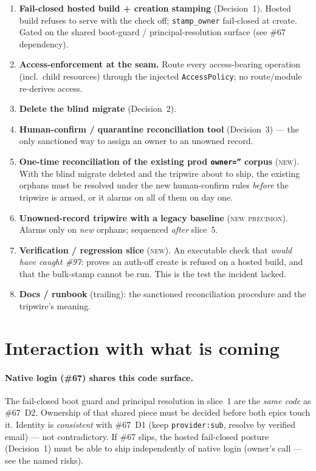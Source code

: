 \documentclass[11pt]{article}
\begin{document}
\begin{enumerate}[leftmargin=1.6em]
  \item \textbf{Fail-closed hosted build + creation stamping} (Decision~1). Hosted build refuses
  to serve with the check off; \texttt{stamp\_owner} fail-closed at create. Gated on the shared
  boot-guard / principal-resolution surface (see \#67 dependency).
  \item \textbf{Access-enforcement at the seam.} Route every access-bearing operation (incl.\
  child resources) through the injected \texttt{AccessPolicy}; no route/module re-derives access.
  \item \textbf{Delete the blind migrate} (Decision~2).
  \item \textbf{Human-confirm / quarantine reconciliation tool} (Decision~3) --- the only
  sanctioned way to assign an owner to an unowned record.
  \item \textbf{One-time reconciliation of the existing prod \texttt{owner=''} corpus}
  (\textsc{new}). With the blind migrate deleted and the tripwire about to ship, the existing
  orphans must be resolved under the new human-confirm rules \emph{before} the tripwire is armed,
  or it alarms on all of them on day one.
  \item \textbf{Unowned-record tripwire with a legacy baseline} (\textsc{new precision}). Alarms
  only on \emph{new} orphans; sequenced \emph{after} slice~5.
  \item \textbf{Verification / regression slice} (\textsc{new}). An executable check that
  \emph{would have caught \#97}: proves an auth-off create is refused on a hosted build, and that
  the bulk-stamp cannot be run. This is the test the incident lacked.
  \item \textbf{Docs / runbook} (trailing): the sanctioned reconciliation procedure and the
  tripwire's meaning.
\end{enumerate}

\section{Interaction with what is coming}
\label{sec:forward}

\paragraph{Native login (\#67) shares this code surface.} The fail-closed boot guard and
principal resolution in slice~1 are the \emph{same code} as \#67~D2. Ownership of that shared
piece must be decided before both epics touch it. Identity is \emph{consistent} with \#67~D1
(keep \texttt{provider:sub}, resolve by verified email) --- not contradictory. If \#67 slips, the
hosted fail-closed posture (Decision~1) must be able to ship independently of native login
(owner's call --- see the named risks).
\end{document}
